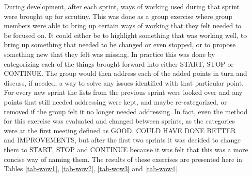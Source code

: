 During development, after each sprint, ways of working used during that sprint were brought up for scrutiny. This was done as a group exercise where group members were able to bring up certain ways of working that they felt needed to be focused on. It could either be to highlight something that was working well, to bring up something that needed to be changed or even stopped, or to propose something new that they felt was missing. In practice this was done by categorizing each of the things brought forward into either START, STOP or CONTINUE. The group would then address each of the added points in turn and discuss, if needed, a way to solve any issues identified with that particular point. For every new sprint the lists from the previous sprint were looked over and any points that still needed addressing were kept, and maybe re-categorized, or removed if the group felt it no longer needed addressing. In fact, even the method for this exercise was evaluated and changed between sprints, as the categories were at the first meeting defined as GOOD, COULD HAVE DONE BETTER and IMPROVEMENTS, but after the first two sprints it was decided to change them to START, STOP and CONTINUE because it was felt that this was a more concise way of naming them. The results of these exercises are presented here in Tables \ref{tab-wow1}, \ref{tab-wow2}, \ref{tab-wow3} and \ref{tab-wow4}.
